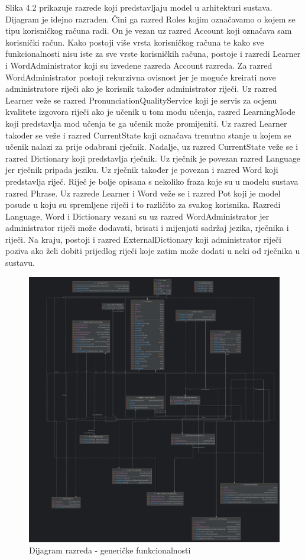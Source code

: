 			Slika 4.2 prikazuje razrede koji predstavljaju model u arhitekturi sustava. Dijagram je idejno razrađen. Čini ga razred Roles kojim označavamo o kojem se tipu korisničkog računa radi. On je vezan uz razred Account koji označava sam korisnički račun. Kako postoji više vrsta korisničkog računa te kako sve funkcionalnosti nisu iste za sve vrste korisničkih računa, postoje i razredi Learner i WordAdministrator koji su izvedene razreda Account razreda. Za razred WordAdministrator postoji rekurzivna ovisnost jer je moguće kreirati nove administratore riječi ako je korisnik također administrator riječi. Uz razred Learner veže se razred PronunciationQualityService koji je servis za ocjenu kvalitete izgovora riječi ako je učenik u tom modu učenja, razred LearningMode koji predstavlja mod učenja te ga učenik može promijeniti. Uz razred Learner također se veže i razred CurrentState koji označava trenutno stanje u kojem se učenik nalazi za prije odabrani rječnik. Nadalje, uz razred CurrentState veže se i razred Dictionary koji predstavlja rječnik. Uz rječnik je povezan razred Language jer rječnik pripada jeziku. Uz rječnik također je povezan i razred Word koji predstavlja riječ. Riječ je bolje opisana s nekoliko fraza koje su u modelu sustava razred Phrase. Uz razrede Learner i Word veže se i razred Pot koji je model posude u koju su spremljene riječi i to različito za svakog korisnika. Razredi Language, Word i Dictionary vezani su uz razred WordAdministrator jer administrator riječi može dodavati, brisati i mijenjati sadržaj jezika, rječnika i riječi. Na kraju, postoji i razred ExternalDictionary koji administrator riječi poziva ako želi dobiti prijedlog riječi koje zatim može dodati u neki od rječnika u sustavu. \newpage
			
			\begin{figure}[H]
				\includegraphics[width=\textwidth]{slike/ClassDiagram0.PNG}
				\caption{Dijagram razreda - generičke funkcionalnosti}
				\label{fig:classDiagram0}
			\end{figure}
			
